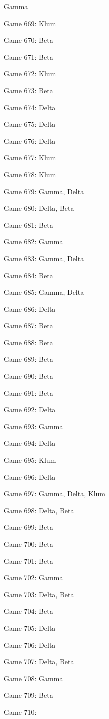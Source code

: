 \documentclass{article}
\begin{document}
\begin{multicols}{3}
\begin{compactitem}
Gamma
\item Game 669:
Klum
\item Game 670:
Beta
\item Game 671:
Beta
\item Game 672:
Klum
\item Game 673:
Beta
\item Game 674:
Delta
\item Game 675:
Delta
\item Game 676:
Delta
\item Game 677:
Klum
\item Game 678:
Klum
\item Game 679:
Gamma, Delta
\item Game 680:
Delta, Beta
\item Game 681:
Beta
\item Game 682:
Gamma
\item Game 683:
Gamma, Delta
\item Game 684:
Beta
\item Game 685:
Gamma, Delta
\item Game 686:
Delta
\item Game 687:
Beta
\item Game 688:
Beta
\item Game 689:
Beta
\item Game 690:
Beta
\item Game 691:
Beta
\item Game 692:
Delta
\item Game 693:
Gamma
\item Game 694:
Delta
\item Game 695:
Klum
\item Game 696:
Delta
\item Game 697:
Gamma, Delta, Klum
\item Game 698:
Delta, Beta
\item Game 699:
Beta
\item Game 700:
Beta
\item Game 701:
Beta
\item Game 702:
Gamma
\item Game 703:
Delta, Beta
\item Game 704:
Beta
\item Game 705:
Delta
\item Game 706:
Delta
\item Game 707:
Delta, Beta
\item Game 708:
Gamma
\item Game 709:
Beta
\item Game 710:

\end{compactitem}
\end{multicols}
\end{document}
